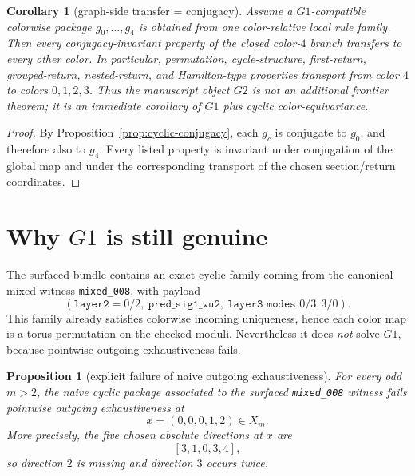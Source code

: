 \documentclass[11pt]{article}
\newtheorem{proposition}[theorem]{Proposition}
\newtheorem{corollary}[theorem]{Corollary}
\begin{document}
\begin{corollary}[graph-side transfer = conjugacy]
\label{cor:G2-closed}
Assume a \(G1\)-compatible colorwise package \(g_0,\dots,g_4\) is obtained from
one color-relative local rule family.
Then every conjugacy-invariant property of the closed color-$4$ branch transfers
to every other color.
In particular, permutation, cycle-structure, first-return, grouped-return,
nested-return, and Hamilton-type properties transport from color $4$ to colors
\(0,1,2,3\).
Thus the manuscript object \(G2\) is not an additional frontier theorem; it is
an immediate corollary of \(G1\) plus cyclic color-equivariance.
\end{corollary}

\begin{proof}
By Proposition~\ref{prop:cyclic-conjugacy}, each \(g_c\) is conjugate to \(g_0\),
and therefore also to \(g_4\).
Every listed property is invariant under conjugation of the global map and under
the corresponding transport of the chosen section/return coordinates.
\end{proof}

\section{Why \(G1\) is still genuine}
The surfaced bundle contains an exact cyclic family coming from the canonical
mixed witness \texttt{mixed\_008}, with payload
\[
(\texttt{layer2}=0/2,\ \texttt{pred\_sig1\_wu2},\ \texttt{layer3 modes }0/3,3/0).
\]
This family already satisfies colorwise incoming uniqueness, hence each color map
is a torus permutation on the checked moduli.
Nevertheless it does \emph{not} solve \(G1\), because pointwise outgoing
exhaustiveness fails.

\begin{proposition}[explicit failure of naive outgoing exhaustiveness]
\label{prop:mixed008-fails-G1}
For every odd \(m>2\), the naive cyclic package associated to the surfaced
\texttt{mixed\_008} witness fails pointwise outgoing exhaustiveness at
\[
 x=(0,0,0,1,2)\in X_m.
\]
More precisely, the five chosen absolute directions at \(x\) are
\[
[3,1,0,3,4],
\]
so direction \(2\) is missing and direction \(3\) occurs twice.
\end{proposition}
\end{document}
